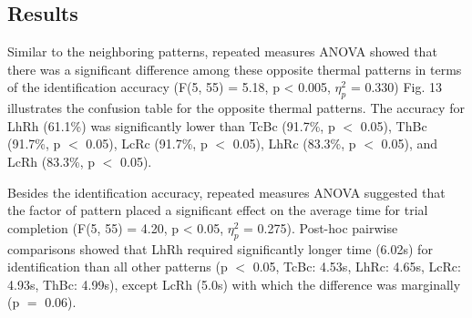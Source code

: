 \documentclass[preprint,12pt]{elsarticle}
\begin{document}
\subsection{Results}


Similar to the neighboring patterns, repeated measures ANOVA showed that there was a significant difference among these opposite thermal patterns in terms of the identification accuracy (F(5, 55) = 5.18, p < 0.005, $\eta_p^2$ = 0.330) Fig. 13 illustrates the confusion table for the opposite thermal patterns. The accuracy for LhRh (61.1\%) was significantly lower than TcBc (91.7\%, p $<$ 0.05), ThBc (91.7\%, p $<$ 0.05), LcRc (91.7\%, p $<$ 0.05), LhRc (83.3\%, p $<$ 0.05), and LcRh (83.3\%, p $<$ 0.05).


 Besides the identification accuracy, repeated measures ANOVA suggested that the factor of pattern placed a significant effect on the average  time for trial completion (F(5, 55) = 4.20, p < 0.05, $\eta_p^2$ = 0.275). Post-hoc pairwise comparisons showed that LhRh required significantly longer time (6.02s) for identification than all other patterns (p $<$ 0.05, TcBc: 4.53s, LhRc: 4.65s, LcRc: 4.93s, ThBc: 4.99s), except LcRh (5.0s) with which the difference was marginally (p $=$ 0.06).
 
\end{document}
